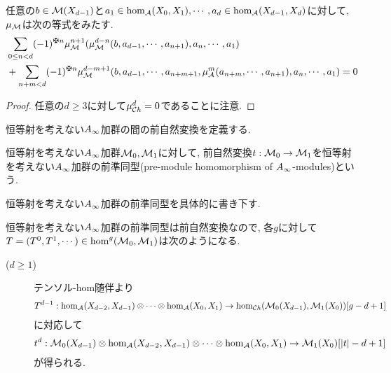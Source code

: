 \documentclass[uplatex, a4paper, 14Q, dvipdfmx]{jsarticle}
\begin{document}
\begin{lemma} \label{prop_Ainf_module_polynomial_equation}
  任意の$b \in \mathcal{M}(X_{d-1})$と$a_1 \in \hom_{\mathcal{A}}(X_0,X_1), \cdots, a_d \in \hom_{\mathcal{A}}(X_{d-1},X_d)$に対して, $\mu_{\mathcal{M}}$は次の等式をみたす. 
  \begin{align*}
    &\sum_{0 \leq n < d} (-1)^{\maltese n} \mu^{n+1}_\M(\mu^{d-n}_\M(b,a_{d-1},\cdots,a_{n+1}), a_n, \cdots, a_1) \\
    &+ \sum_{n+m < d} (-1)^{\maltese n} \mu^{d-m+1}_\M(b,a_{d-1},\cdots,a_{n+m+1}, \mu^m_\A(a_{n+m},\cdots,a_{n+1}), a_n, \cdots, a_1)
    = 0
  \end{align*}
\end{lemma}

\begin{proof}
  任意の$d \geq 3$に対して$\mu^d_{\mathcal{C} h} = 0$であることに注意.
\end{proof}

恒等射を考えない$A_{\infty}$加群の間の前自然変換を定義する. 

\begin{definition}
  恒等射を考えない$A_{\infty}$加群$\mathcal{M}_0,\mathcal{M}_1$に対して, 前自然変換$t : \mathcal{M}_0 \to \mathcal{M}_1$を恒等射を考えない$A_{\infty}$加群の前準同型(pre-module homomorphism of $A_{\infty}$-modules)という.
\end{definition}

恒等射を考えない$A_{\infty}$加群の前準同型を具体的に書き下す.

\begin{remark} 
  恒等射を考えない$A_{\infty}$加群の前準同型は前自然変換なので, 各$g$に対して$T = (T^0,T^1,\cdots) \in \hom^{g} (\mathcal{M}_0,\mathcal{M}_1)$は次のようになる. 
  \begin{description}
    \item[($d \geq 1$)] テンソル-hom随伴より
    \begin{align*}
      T^{d-1} : \hom_{\mathcal{A}}(X_{d-2},X_{d-1}) \otimes \cdots \otimes \hom_{\mathcal{A}}(X_0,X_1) \to \hom_{\mathcal{C} h}(\mathcal{M}_0(X_{d-1}), \mathcal{M}_1(X_0))[g-d+1]
    \end{align*}
    に対応して
    \begin{align*}
      t^d : \mathcal{M}_0(X_{d-1}) \otimes \hom_{\mathcal{A}}(X_{d-2},X_{d-1}) \otimes \cdots \otimes \hom_{\mathcal{A}}(X_0,X_1) \to \mathcal{M}_1(X_0)[|t|-d+1]
    \end{align*}
    が得られる.  
  \end{description}
\end{remark}

\end{document}

